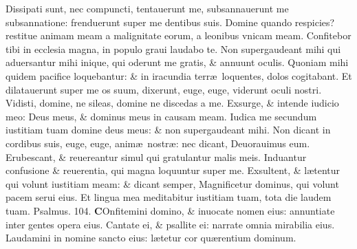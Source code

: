 \documentclass[a5paper,10pt]{book}
\def\ae{æ}
\begin{document}
\begin{multicols*}{2}
\newline \color{red} D\color{black}issipati sunt, nec compuncti, tentauerunt me, subsannauerunt me subsannatione: frenduerunt super me dentibus suis.
\newline \color{red} D\color{black}omine quando respicies? restitue animam meam a malignitate eorum, a leonibus vnicam meam.
\newline \color{red} C\color{black}onfitebor tibi in ecclesia magna, in populo graui laudabo te.
\newline \color{red} N\color{black}on supergaudeant mihi qui aduersantur mihi inique, qui oderunt me gratis, \& annuunt oculis.
\newline \color{red} Q\color{black}uoniam mihi quidem pacifice loquebantur: \& in iracundia terr\ae \ loquentes, dolos cogitabant.
\newline \color{red} E\color{black}t dilatauerunt super me os suum, dixerunt, euge, euge, viderunt oculi nostri.
\newline \color{red} V\color{black}idisti, domine, ne sileas, domine ne discedas a me.
\newline \color{red} E\color{black}xsurge, \& intende iudicio meo: Deus meus, \& dominus meus in causam meam.
\newline \color{red} I\color{black}udica me secundum iustitiam tuam domine deus meus: \& non supergaudeant mihi.
\newline \color{red} N\color{black}on dicant in cordibus suis, euge, euge, anim\ae \ nostr\ae : nec dicant, Deuorauimus eum.
\newline \color{red} E\color{black}rubescant, \& reuereantur simul qui gratulantur malis meis.
\newline \color{red} I\color{black}nduantur confusione \& reuerentia, qui magna loquuntur super me.
\newline \color{red} E\color{black}xsultent, \& l\ae tentur qui volunt iustitiam meam: \& dicant semper, Magnificetur dominus, qui volunt pacem serui eius.
\newline \color{red} E\color{black}t lingua mea meditabitur iustitiam tuam, tota die laudem tuam.
\newline \color{red} Psalmus. 104. \color{black}
\vspace{-.5em}
\lettrine[lines=2]{\bfseries \color{red} C}{}Onfitemini domino, \& inuocate nomen eius: annuntiate inter gentes opera eius.
\newline \color{red} C\color{black}antate ei, \& psallite ei: narrate omnia mirabilia eius.
\newline \color{red} L\color{black}audamini in nomine sancto eius: l\ae tetur cor qu\ae rentium dominum.

\end{multicols*}
\end{document}

